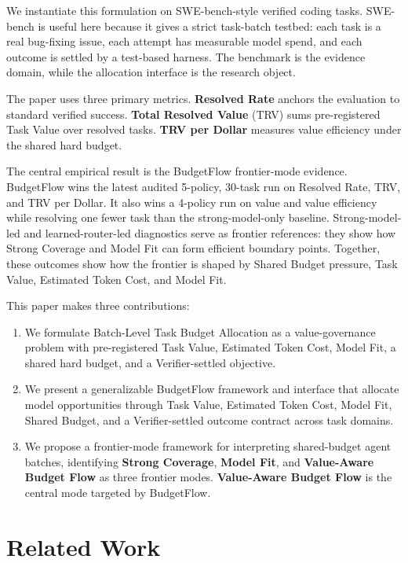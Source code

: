 \documentclass[sigconf,review,anonymous]{acmart}
\newcommand{\method}{BudgetFlow\xspace}
\newcommand{\trv}{TRV\xspace}
\newcommand{\taskvalue}{Task Value\xspace}
\newcommand{\tokencost}{Estimated Token Cost\xspace}
\newcommand{\modelfit}{Model Fit\xspace}
\newcommand{\sharedbudget}{Shared Budget\xspace}
\newcommand{\verifier}{Verifier\xspace}
\begin{document}
We instantiate this formulation on SWE-bench-style verified coding tasks. SWE-bench is useful here because it gives a strict task-batch testbed: each task is a real bug-fixing issue, each attempt has measurable model spend, and each outcome is settled by a test-based harness. The benchmark is the evidence domain, while the allocation interface is the research object.

The paper uses three primary metrics. \textbf{Resolved Rate} anchors the evaluation to standard verified success. \textbf{Total Resolved Value} (\trv) sums pre-registered \taskvalue over resolved tasks. \textbf{\trv per Dollar} measures value efficiency under the shared hard budget.

The central empirical result is the \method frontier-mode evidence. \method wins the latest audited 5-policy, 30-task run on Resolved Rate, \trv, and \trv per Dollar. It also wins a 4-policy run on value and value efficiency while resolving one fewer task than the strong-model-only baseline. Strong-model-led and learned-router-led diagnostics serve as frontier references: they show how Strong Coverage and Model Fit can form efficient boundary points. Together, these outcomes show how the frontier is shaped by \sharedbudget pressure, \taskvalue, \tokencost, and \modelfit.

This paper makes three contributions:

\begin{enumerate}
    \item We formulate Batch-Level Task Budget Allocation as a value-governance problem with pre-registered \taskvalue, \tokencost, \modelfit, a shared hard budget, and a \verifier-settled objective.
    \item We present a generalizable \method framework and interface that allocate model opportunities through \taskvalue, \tokencost, \modelfit, \sharedbudget, and a \verifier-settled outcome contract across task domains.
    \item We propose a frontier-mode framework for interpreting shared-budget agent batches, identifying \textbf{Strong Coverage}, \textbf{Model Fit}, and \textbf{Value-Aware Budget Flow} as three frontier modes. \textbf{Value-Aware Budget Flow} is the central mode targeted by \method.
\end{enumerate}

\section{Related Work}
\label{sec:related}
\end{document}
